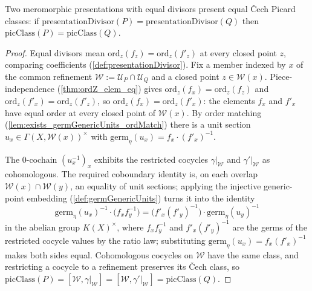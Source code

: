 \begin{theorem}
  \label{thm:picClass_eq_of_presentationDivisor_eq}
  \leanok
  Two meromorphic presentations with equal divisors present equal \v Cech Picard classes: if
  \(\mathrm{presentationDivisor}(P) = \mathrm{presentationDivisor}(Q)\) then \(\mathrm{picClass}(P)
  = \mathrm{picClass}(Q)\).
\end{theorem}
\begin{proof}
  \leanok
  Equal divisors mean \(\mathrm{ord}_z(f_z) = \mathrm{ord}_z(f'_z)\) at every closed point \(z\),
  comparing coefficients (\ref{def:presentationDivisor}). Fix a member indexed by \(x\) of the
  common refinement \(\mathcal W := \mathcal U_P \cap \mathcal U_Q\) and a closed point \(z \in
  \mathcal W(x)\). Piece-independence (\ref{thm:ordZ_elem_eq}) gives \(\mathrm{ord}_z(f_x) =
  \mathrm{ord}_z(f_z)\) and \(\mathrm{ord}_z(f'_x) = \mathrm{ord}_z(f'_z)\), so \(\mathrm{ord}_z(f_x)
  = \mathrm{ord}_z(f'_x)\): the elements \(f_x\) and \(f'_x\) have equal order at every closed
  point of \(\mathcal W(x)\). By order matching (\ref{lem:exists_germGenericUnits_ordMatch}) there
  is a unit section \(u_x \in \Gamma(X, \mathcal W(x))^{\times}\) with \(\mathrm{germ}_\eta(u_x) =
  f_x \cdot (f'_x)^{-1}\).

  The \(0\)-cochain \((u_x^{-1})_x\) exhibits the restricted cocycles \(\gamma|_{\mathcal W}\) and
  \(\gamma'|_{\mathcal W}\) as cohomologous. The required coboundary identity is, on each overlap
  \(\mathcal W(x) \cap \mathcal W(y)\), an equality of unit sections; applying the injective
  generic-point embedding (\ref{def:germGenericUnits}) turns it into the identity
  \[
    \mathrm{germ}_\eta(u_x)^{-1} \cdot \bigl(f_x f_y^{-1}\bigr) = \bigl(f'_x (f'_y)^{-1}\bigr) \cdot
      \mathrm{germ}_\eta(u_y)^{-1}
  \]
  in the abelian group \(K(X)^{\times}\), where \(f_x f_y^{-1}\) and \(f'_x (f'_y)^{-1}\) are the
  germs of the restricted cocycle values by the ratio law; substituting \(\mathrm{germ}_\eta(u_x) =
  f_x (f'_x)^{-1}\) makes both sides equal. Cohomologous cocycles on \(\mathcal W\) have the same
  class, and restricting a cocycle to a refinement preserves its \v Cech class, so
  \(\mathrm{picClass}(P) = [\mathcal W, \gamma|_{\mathcal W}] = [\mathcal W, \gamma'|_{\mathcal W}]
  = \mathrm{picClass}(Q)\).
\end{proof}

